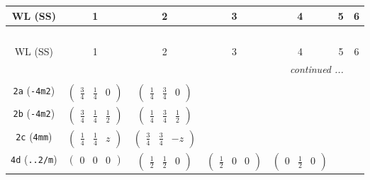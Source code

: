 \documentclass[fleqn,9pt,landscape]{jsarticle}
\begin{document}
\begin{center}
\renewcommand{\arraystretch}{1.2}
\begin{longtable}{ccccccc}
 \hline \hline
WL (SS) & 1 & 2 & 3 & 4 & 5 & 6 \\ \hline \endfirsthead

\multicolumn{6}{l}{\tablename\ \thetable{}} \\
 \hline \hline
WL (SS) & 1 & 2 & 3 & 4 & 5 & 6 \\ \hline \endhead

 \hline \hline
\multicolumn{6}{r}{\footnotesize\it continued ...} \\ \endfoot

 \hline \hline
\multicolumn{6}{r}{} \\ \endlastfoot

{\tt 2a} ({\tt -4m2}) & $ \begin{pmatrix} \frac{3}{4} & \frac{1}{4} & 0 \end{pmatrix} $ & $ \begin{pmatrix} \frac{1}{4} & \frac{3}{4} & 0 \end{pmatrix} $ & $  $ & $  $ & $  $ & $  $ \\ \hline
{\tt 2b} ({\tt -4m2}) & $ \begin{pmatrix} \frac{3}{4} & \frac{1}{4} & \frac{1}{2} \end{pmatrix} $ & $ \begin{pmatrix} \frac{1}{4} & \frac{3}{4} & \frac{1}{2} \end{pmatrix} $ & $  $ & $  $ & $  $ & $  $ \\ \hline
{\tt 2c} ({\tt 4mm}) & $ \begin{pmatrix} \frac{1}{4} & \frac{1}{4} & z \end{pmatrix} $ & $ \begin{pmatrix} \frac{3}{4} & \frac{3}{4} & - z \end{pmatrix} $ & $  $ & $  $ & $  $ & $  $ \\ \hline
{\tt 4d} ({\tt ..2/m}) & $ \begin{pmatrix} 0 & 0 & 0 \end{pmatrix} $ & $ \begin{pmatrix} \frac{1}{2} & \frac{1}{2} & 0 \end{pmatrix} $ & $ \begin{pmatrix} \frac{1}{2} & 0 & 0 \end{pmatrix} $ & $ \begin{pmatrix} 0 & \frac{1}{2} & 0 \end{pmatrix} $ & $  $ & $  $ \\ \hline

\end{longtable}
\end{center}
\end{document}
